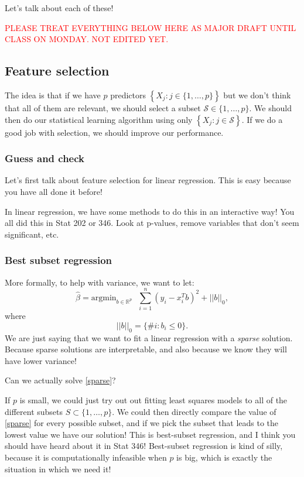 Let's talk about each of these!

\Large
\textcolor{red}{PLEASE TREAT EVERYTHING BELOW HERE AS MAJOR DRAFT UNTIL CLASS ON MONDAY. NOT EDITED YET.}

\normalsize

\subsection{Feature selection}

The idea is that if we have $p$ predictors $\left\{X_j : j \in \{1,\ldots,p\}\right\}$ but we don't think that all of them are relevant, we should select a subset $\mathcal{S} \in \{1,\ldots,p\}$. We should then do our statistical learning algorithm using only $\left\{X_j : j \in \mathcal{S} \right\}$. If we do a good job with selection, we should improve our performance. 

\subsubsection{Guess and check}

Let's first talk about feature selection for linear regression. This is easy because you have all done it before! 

In linear regression, we have some methods to do this in an interactive way! You all did this in Stat 202 or 346. Look at p-values, remove variables that don't seem significant, etc.

\subsubsection{Best subset regression}

More formally, to help with variance, we want to let:
\begin{equation}
\label{sparse}	
\hat{\beta} = \mathrm{argmin}_{b \in \mathbb{R}^p} \ \ \ \sum_{i=1}^n \left( y_i - x_i^T b \right)^2 + ||b||_0,
\end{equation}
where
$$
||b||_0 = \{ \#i : b_i \leq 0 \}.
$$
We are just saying that we want to fit a linear regression with a \emph{sparse} solution. Because sparse solutions are interpretable, and also because we know they will have lower variance! 

Can we actually solve \eqref{sparse}? 


If $p$ is small, we could just try out out fitting least squares models to all of the different subsets $S \subset \{1,\ldots,p\}$. We could then directly compare the value of  \eqref{sparse} for every possible subset, and if we pick the subset that leads to the lowest value we have our solution! This is best-subset regression, and I think you should have heard about it in Stat 346! Best-subset regression is kind of silly, because it is computationally infeasible when $p$ is big, which is exactly the situation in which we need it! 

